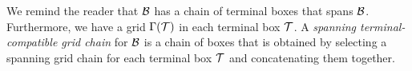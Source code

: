 \documentclass{acmsmall}
\newcommand{\cB}{{\cal B}}
\newcommand{\cC}{{\cal C}}
\newcommand{\cT}{{\cal T}}
\newcommand{\cU}{{\cal U}}
\newcommand{\lis}{{\tt lis}}
\newcommand{\alis}{{\tt alis}}
\newcommand{\terminalbox}{{\rm{\bf TerminalBox}}}
\newcommand{\gridprecval}{\frac{1}{(C_2\errorcont)^4}}
\newcommand{\width}{{\bf {\rm  w}}}
\newcommand{\gridprec}{\alpha}
\newcommand{\errorcont}{\Psi}
\newcommand{\ssz}{\sigma}
\newcommand{\approxlis}{{\rm {\bf ApproxLIS}}}
\newcommand{\findsplitter}{{\rm {\bf FindSplitter}}}
\newcommand{\buildgrid}{{\rm {\bf BuildGrid}}}
\begin{document}
We remind the reader that $\cB$ has a chain of terminal boxes that spans $\cB$. Furthermore,
we have a grid $\Gamma(\cT)$ in each terminal box $\cT$.  A {\em spanning terminal-compatible grid chain} for $\cB$
is a chain of boxes that is obtained by selecting a spanning grid chain for each terminal box $\cT$
and concatenating them together.

%
%
%
%
%
\end{document}
